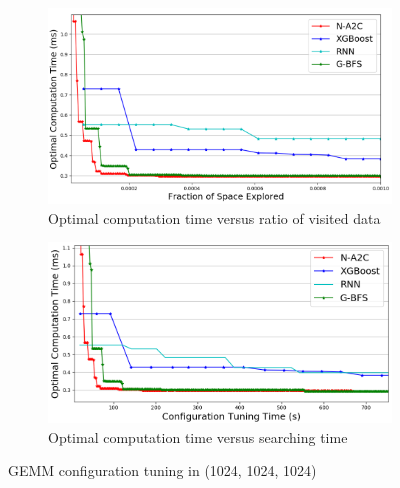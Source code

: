 \begin{figure}[t]
    \centering
    \begin{subfigure}[b]{0.45\textwidth}
    \includegraphics[width=\linewidth]{5_Simu/simu_11.png}
    \caption{Optimal computation time versus ratio of visited data}
    \label{fig:simu11}
    \end{subfigure}
    \hspace{0.2in}
    \begin{subfigure}[b]{0.45\textwidth}
    \includegraphics[width=\linewidth]{5_Simu/simu_12.png}
    \caption{Optimal computation time versus searching time}
    \label{fig:simu12}
    \end{subfigure}
    \caption{GEMM configuration tuning in (1024, 1024, 1024)}
    \label{fig:1024}
\end{figure}





